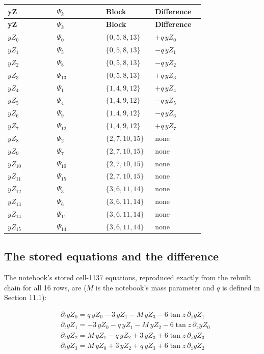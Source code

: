 \documentclass[11pt]{article}
\begin{document}
\begin{longtable}{@{}p{0.230\linewidth}p{0.230\linewidth}p{0.230\linewidth}p{0.230\linewidth}@{}}
\toprule
\textbf{yZ} & \textbf{$\Psi_k$} & \textbf{Block} & \textbf{Difference} \\
\midrule
\endfirsthead
\toprule
\textbf{yZ} & \textbf{$\Psi_k$} & \textbf{Block} & \textbf{Difference} \\
\midrule
\endhead
$yZ_{0}$ & $\Psi_{0}$ & $\{0,5,8,13\}$ & $+q\,yZ_{0}$ \\
$yZ_{1}$ & $\Psi_{5}$ & $\{0,5,8,13\}$ & $-q\,yZ_{1}$ \\
$yZ_{2}$ & $\Psi_{8}$ & $\{0,5,8,13\}$ & $-q\,yZ_{2}$ \\
$yZ_{3}$ & $\Psi_{13}$ & $\{0,5,8,13\}$ & $+q\,yZ_{3}$ \\
$yZ_{4}$ & $\Psi_{1}$ & $\{1,4,9,12\}$ & $+q\,yZ_{4}$ \\
$yZ_{5}$ & $\Psi_{4}$ & $\{1,4,9,12\}$ & $-q\,yZ_{5}$ \\
$yZ_{6}$ & $\Psi_{9}$ & $\{1,4,9,12\}$ & $-q\,yZ_{6}$ \\
$yZ_{7}$ & $\Psi_{12}$ & $\{1,4,9,12\}$ & $+q\,yZ_{7}$ \\
$yZ_{8}$ & $\Psi_{2}$ & $\{2,7,10,15\}$ & none \\
$yZ_{9}$ & $\Psi_{7}$ & $\{2,7,10,15\}$ & none \\
$yZ_{10}$ & $\Psi_{10}$ & $\{2,7,10,15\}$ & none \\
$yZ_{11}$ & $\Psi_{15}$ & $\{2,7,10,15\}$ & none \\
$yZ_{12}$ & $\Psi_{3}$ & $\{3,6,11,14\}$ & none \\
$yZ_{13}$ & $\Psi_{6}$ & $\{3,6,11,14\}$ & none \\
$yZ_{14}$ & $\Psi_{11}$ & $\{3,6,11,14\}$ & none \\
$yZ_{15}$ & $\Psi_{14}$ & $\{3,6,11,14\}$ & none \\
\bottomrule
\end{longtable}

\subsection{The stored equations and the difference}

The notebook's stored cell-1137 equations, reproduced exactly from the rebuilt chain for all 16 rows, are ($M$ is the notebook's mass parameter and $q$ is defined in Section 11.1):

\[
\begin{aligned}
&\partial_t yZ_{0}=q\,yZ_{0}-3\,yZ_{1}-M\,yZ_{3}-6\tan z\,\partial_z yZ_{1} \\
&\partial_t yZ_{1}=-3\,yZ_{0}-q\,yZ_{1}-M\,yZ_{2}-6\tan z\,\partial_z yZ_{0} \\
&\partial_t yZ_{2}=M\,yZ_{1}-q\,yZ_{2}+3\,yZ_{3}+6\tan z\,\partial_z yZ_{3} \\
&\partial_t yZ_{3}=M\,yZ_{0}+3\,yZ_{2}+q\,yZ_{3}+6\tan z\,\partial_z yZ_{2}
\end{aligned}\tag{stored, block 0,5,8,13}
\]
\end{document}
